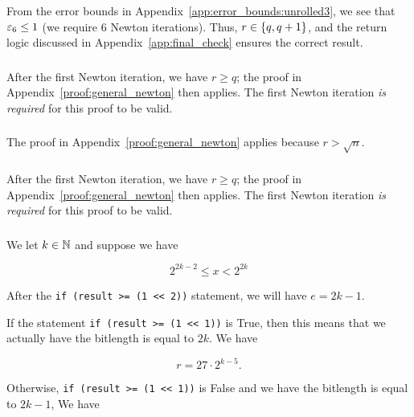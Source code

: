From the error bounds in Appendix~\ref{app:error_bounds:unrolled3},
we see that $\varepsilon_{6}\le1$ (we require 6 Newton iterations).
Thus, $r\in\left\{ q,q+1 \right\}$, and the return logic
discussed in Appendix~\ref{app:final_check} ensures the correct result.

\subsubsection{\WhileOne{}}

After the first Newton iteration, we have $r\ge q$;
the proof in Appendix~\ref{proof:general_newton} then applies.
The first Newton iteration \emph{is required} for this proof to be valid.

\subsubsection{\WhileTwo{}}

The proof in Appendix~\ref{proof:general_newton} applies
because $r > \sqrt{n}$.

\subsubsection{\WhileThree{}}

After the first Newton iteration, we have $r\ge q$;
the proof in Appendix~\ref{proof:general_newton} then applies.
The first Newton iteration \emph{is required} for this proof to be valid.

\subsubsection{\BitLength{}}
\label{app:conv_proof:bitlength}

We let $k\in\mathbb{N}$ and suppose we have

\begin{equation}
    2^{2k-2} \le x < 2^{2k}
\end{equation}

\noindent
After the \texttt{if (result >= (1 << 2))} statement,
we will have $e = 2k-1$.

If the statement \texttt{if (result >= (1 << 1))} is \textsf{True},
then this means that we actually have the bitlength is equal to $2k$.
We have

\begin{equation}
    r = 27\cdot 2^{k-5}.
\end{equation}

\noindent
Otherwise, \texttt{if (result >= (1 << 1))} is \textsf{False}
and we have the bitlength is equal to $2k-1$,
We have

